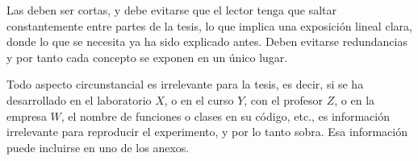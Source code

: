 Las  deben ser cortas, y debe evitarse que el lector tenga que saltar
constantemente entre partes de la tesis, lo que implica una exposición lineal
clara, donde lo que se necesita ya ha sido explicado antes. Deben evitarse
redundancias y por tanto cada concepto se exponen en un único lugar.

Todo aspecto circunstancial es irrelevante para la tesis, es decir, si se ha
desarrollado en el laboratorio $X$, o en el curso $Y$, con el profesor $Z$, o
en la empresa $W$, el nombre de funciones o clases en su código, etc., es
información irrelevante para reproducir el experimento, y por lo tanto sobra.
%
Esa información puede incluirse en uno de los anexos.

\begin{comment}
\subsubsection{Numeración del documento}

La primera página de la tesis es la correspondiente a la introducción,
así que ésta debe ser la página 1. Desde la introducción, hasta antes
de la bibliografía, las unidades son ``Capítulos''. La bibliografía y
anexos no se consideran capítulos, así que ya no continúan con la
misma numeración de los capítulos (la paginación sí continua). Los
índices, notación, glosario, etc.\ se numeran con números romanos en
versalitas ({\textsc{I}, \textsc{II}, \textsc{III}, \textsc{IV},
  \textsc{V}, \textsc{VI}}$\ldots$) y antes del índice (portada,
resúmenes, agradecimientos, hoja de evaluadores, etc.) las páginas no
llevan numeración.

Esta plantilla LaTeX ya se ocupa de todo lo anterior.

\subsection{Ecuaciones}

Para citar \nt{ecuaciones} se utilizan siempre paréntesis redondos, y
no es necesario emplear explícitamente la palabra ``ecuación''. Por
ejemplo ``Introduciendo en (4.2) los resultados de (3.3) y (3.7) se
obtiene ...''.  Se usa la palabra ``Ecuación'' solo si la frase inicia
con ello.  Por ejemplo ``La ecuación~\equ{eq:ej1} permite calcular la
corriente.''.

A diferencia de figura y cuadro, toda ecuación es parte del flujo de
texto y no un objeto flotante, así que \textbf{no} pueden emplearse de
la misma forma que las figuras o cuadros.  Esto es, cuando se requiere
introducir una ecuación, se pone directamente donde se necesita y por
tanto no es necesario citarla.


\end{comment}
